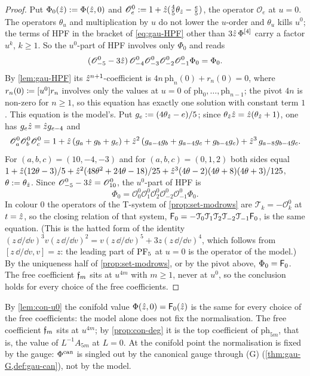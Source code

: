 \begin{proof}
Put $\Phi_0(\hat{z}):=\Phi(\hat{z},0)$ and $\mathscr O^0_e:=1+\hat{z}(\tfrac45\theta_{\hat{z}}-\tfrac e5)$, the operator $\mathscr O_e$ at $u=0$. The operators $\theta_u$ and multiplication by $u$ do not lower the $u$-order and $\theta_u$ kills $u^0$; the terms of HPF in the bracket of \eqref{eq:gau-HPF} other than $3\hat{z}\,\Phi^{[4]}$ carry a factor $u^k$, $k\geq 1$. So the $u^0$-part of HPF involves only $\Phi_0$ and reads
\[
(\mathscr O^0_{-5}-3\hat{z})\,\mathscr O^0_{-4}\mathscr O^0_{-3}\mathscr O^0_{-2}\mathscr O^0_{-1}\Phi_0=\Phi_0 .
\]
By \cref{lem:gau-HPF} its $\hat{z}^{n+1}$-coefficient is $4n\,\mathrm{ph}_n(0)+r_n(0)=0$, where $r_n(0)\coloneqq[u^0]r_n$ involves only the values at $u=0$ of $\mathrm{ph}_0,\dots,\mathrm{ph}_{n-1}$; the pivot $4n$ is non-zero for $n\geq 1$, so this equation has exactly one solution with constant term $1$. This equation is the model's. Put $g_e:=(4\theta_{\hat{z}}-e)/5$; since $\theta_{\hat{z}}\hat{z}=\hat{z}(\theta_{\hat{z}}+1)$, one has $g_e\hat{z}=\hat{z} g_{e-4}$ and
\[
\mathscr O^0_a\mathscr O^0_b\mathscr O^0_c=1+\hat{z}\,(g_a+g_b+g_c)+\hat{z}^2\,(g_{a-4}g_b+g_{a-4}g_c+g_{b-4}g_c)+\hat{z}^3\,g_{a-8}g_{b-4}g_c .
\]
For $(a,b,c)=(10,-4,-3)$ and for $(a,b,c)=(0,1,2)$ both sides equal $1+\hat{z}(12\theta-3)/5+\hat{z}^2(48\theta^2+24\theta-18)/25+\hat{z}^3(4\theta-2)(4\theta+8)(4\theta+3)/125$, $\theta:=\theta_{\hat{z}}$. Since $\mathscr O^0_{-5}-3\hat{z}=\mathscr O^0_{10}$, the $u^0$-part of HPF is
\[
\Phi_0=\mathscr O^0_0\mathscr O^0_1\mathscr O^0_2\mathscr O^0_{-2}\mathscr O^0_{-1}\Phi_0 .
\]
In colour $0$ the operators of the T-system of \cref{prop:set-modrows} are $\mathcal T_k=-\mathscr O^0_k$ at $t=\hat{z}$, so the closing relation of that system, $\mathsf{F}_0=-\mathcal T_0\mathcal T_1\mathcal T_2\mathcal T_{-2}\mathcal T_{-1}\mathsf{F}_0$, is the same equation. (This is the hatted form of the identity $(z\,\dd/\dd v)^3v(z\,\dd/\dd v)^2=v(z\,\dd/\dd v)^5+3z(z\,\dd/\dd v)^4$, which follows from $[z\,\dd/\dd v,v]=z$: the leading part of $\mathrm{PF}_{5}$ at $u=0$ is the operator of the model.) By the uniqueness half of \cref{prop:set-modrows}, or by the pivot above, $\Phi_0=\mathsf{F}_0$. The free coefficient $\mathfrak{f}_m$ sits at $u^{4m}$ with $m\geq 1$, never at $u^0$, so the conclusion holds for every choice of the free coefficients.
\end{proof}

\begin{rmk}
\label{rmk:con-model}
By \cref{lem:con-u0} the conifold value $\Phi(\hat{z},0)=\mathsf{F}_0(\hat{z})$ is the same for every choice of the free coefficients: the model alone does not fix the normalisation. The free coefficient $\mathfrak{f}_m$ sits at $u^{4m}$; by \cref{prop:con-deg} it is the top coefficient of $\mathrm{ph}_{5m}$, that is, the value of $L^{-1}A_{5m}$ at $L=0$. At the conifold point the normalisation is fixed by the gauge: $\Phi^{\mathrm{can}}$ is singled out by the canonical gauge through (G) (\cref{thm:gau-G,def:gau-can}), not by the model.
\end{rmk}


